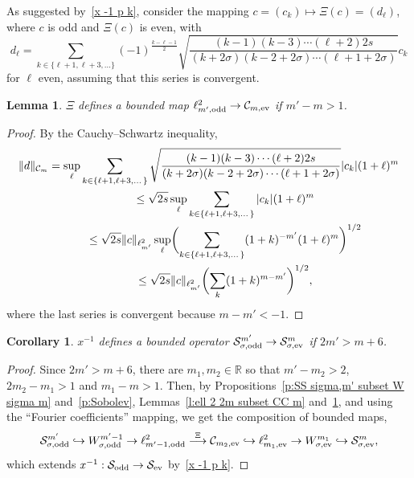 \documentclass[11pt]{article}
\newtheorem{Corollary}[Theorem]{Corollary}
\newtheorem{Lemma}[Theorem]{Lemma}
\newcommand{\R}{\mathbb{R}}
\newcommand{\CC}{\mathcal{C}}
\renewcommand{\SS}{\mathcal{S}}
\begin{document}
As suggested by~\eqref{x -1 p k}, consider the mapping $c=(c_k)\mapsto\Xi(c)=(d_\ell)$, where $c$ is odd and $\Xi(c)$ is even, with
  \[
    d_\ell=\sum_{k\in\{\ell+1,\ell+3,\dots\}}(-1)^{\frac{k-\ell-1}{2}}\sqrt{\frac{(k-1)(k-3)\cdots(\ell+2)2s}{(k+2\sigma)(k-2+2\sigma)\cdots(\ell+1+2\sigma)}}
    c_k
  \]
for $\ell$ even, assuming that this series is convergent.

\begin{Lemma}\label{l:Xi}
  $\Xi$ defines a bounded map $\ell^2_{m',\text{\rm odd}}\to\CC_{m,\text{\rm ev}}$ if $m'-m>1$.
\end{Lemma}

\begin{proof}
  By the Cauchy--Schwartz  inequality,
    \begin{gather*}
      \|d\|_{\CC_m} =\sup_\ell\sum_{k\in\{\ell+1,\ell+3,\dots\}}\sqrt{\frac{(k-1)(k-3)\cdots(\ell+2)2s}{(k+2\sigma)(k-2+2\sigma)\cdots(\ell+1+2\sigma)}} |c_k| (1+\ell)^m\\
\hphantom{\|d\|_{\CC_m}}{}
\le\sqrt{2s}\sup_\ell\sum_{k\in\{\ell+1,\ell+3,\dots\}}|c_k| (1+\ell)^m\\
\hphantom{\|d\|_{\CC_m}}{}
\le\sqrt{2s} \|c\|_{\ell^2_{m'}}\sup_\ell\biggl(\sum_{k\in\{\ell+1,\ell+3,\dots\}}(1+k)^{-m'}(1+\ell)^m\biggr)^{1/2}\\
\hphantom{\|d\|_{\CC_m}}{}
\le\sqrt{2s} \|c\|_{\ell^2_{m'}}\biggl(\sum_k(1+k)^{m-m'}\biggr)^{1/2} ,
    \end{gather*}
  where the last series is convergent because $m-m'<-1$.
\end{proof}

 \begin{Corollary}\label{c:x^-1:SS_sigma,odd^m_1 to SS_sigma,ev^m bounded}
  $x^{-1}$ defines a bounded operator $\SS_{\sigma,\text{\rm odd}}^{m'}\to\SS_{\sigma,\text{\rm ev}}^m$ if $2m'>m+6$.
\end{Corollary}

\begin{proof}
  Since $2m'>m+6$, there are $m_1,m_2\in\R$ so that $m'-m_2>2$, $2m_2-m_1>1$ and $m_1-m>1$. Then, by Propositions~\ref{p:SS sigma,m' subset W sigma m} and~\ref{p:Sobolev}, Lemmas~\ref{l:ell 2 2m subset CC m} and~\ref{l:Xi}, and using the ``Fourier coef\/f\/icients'' mapping, we get the composition of bounded maps,
    \[
      \SS_{\sigma,\text{\rm odd}}^{m'}\hookrightarrow W_{\sigma,\text{\rm odd}}^{m'-1}\rightarrow\ell^2_{m'-1,\text{\rm odd}}\overset{\Xi}{\longrightarrow}\CC_{m_2,\text{\rm ev}}\hookrightarrow\ell^2_{m_1,\text{\rm ev}}\rightarrow W_{\sigma,\text{\rm ev}}^{m_1}\hookrightarrow\SS_{\sigma,\text{\rm ev}}^m ,
    \]
  which extends $x^{-1}:\SS_{\text{\rm odd}}\to\SS_{\text{\rm ev}}$ by~\eqref{x -1 p k}.
\end{proof}
\end{document}
